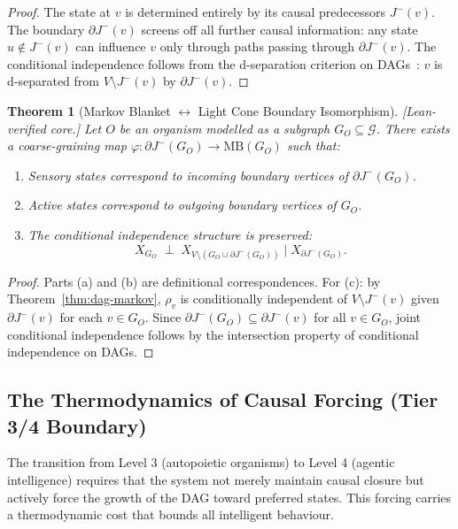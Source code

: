 \documentclass[11pt,a4paper]{article}
\newtheorem{theorem}{Theorem}[section]
\theoremstyle{remark}
\newcommand{\MB}{\mathrm{MB}}
\newcommand{\GG}{\mathcal{G}}
\begin{document}
\begin{proof}
The state at $v$ is determined entirely by its causal predecessors $J^-(v)$.
The boundary $\partial J^-(v)$ screens off all further causal information: any
state $u \notin J^-(v)$ can influence $v$ only through paths passing through
$\partial J^-(v)$. The conditional independence follows from the d-separation
criterion on DAGs~\citep{Pearl1988}: $v$ is d-separated from $V \setminus J^-(v)$
by $\partial J^-(v)$.
\end{proof}

\begin{theorem}[Markov Blanket $\leftrightarrow$ Light Cone Boundary Isomorphism]
\label{thm:iso}
\textup{[Lean-verified core.]}
Let $O$ be an organism modelled as a subgraph $G_O \subseteq \GG$. There exists a
coarse-graining map $\varphi: \partial J^-(G_O) \to \MB(G_O)$ such that:
\begin{enumerate}[label=\emph{(\alph*)},noitemsep]
  \item Sensory states correspond to incoming boundary vertices of $\partial J^-(G_O)$.
  \item Active states correspond to outgoing boundary vertices of $G_O$.
  \item The conditional independence structure is preserved:
  \begin{equation}
    X_{G_O} \;\perp\; X_{V \setminus (G_O \cup \partial J^-(G_O))}
    \;\Big|\; X_{{\partial J^-(G_O)}}.
  \end{equation}
\end{enumerate}
\end{theorem}

\begin{proof}
Parts (a) and (b) are definitional correspondences. For (c): by
Theorem~\ref{thm:dag-markov}, $\rho_v$ is conditionally independent of
$V \setminus J^-(v)$ given $\partial J^-(v)$ for each $v \in G_O$. Since
$\partial J^-(G_O) \subseteq \partial J^-(v)$ for all $v \in G_O$, joint
conditional independence follows by the intersection property of conditional
independence on DAGs.
\end{proof}

\subsection{The Thermodynamics of Causal Forcing (Tier 3/4 Boundary)}
\label{sec:steering_rahc}

The transition from Level 3 (autopoietic organisms) to Level 4 (agentic
intelligence) requires that the system not merely maintain causal closure but
actively force the growth of the DAG toward preferred states. This forcing carries
a thermodynamic cost that bounds all intelligent behaviour.
\end{document}
